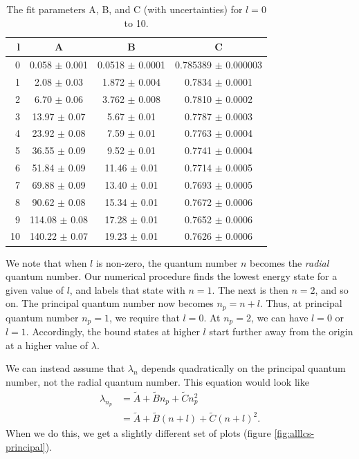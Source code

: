 \documentclass[12pt,twoside]{reedthesis}
\newcommand{\eq}[1]{\begin{align}#1\end{align}}
\begin{document}
\begin{table}[h]
	\centering
	\caption{The fit parameters A, B, and C (with uncertainties) for $l = 0$ to 10.}
	\label{tab:fitparams}
	\begin{tabular}{r|ccc}
		l	& A	 	& B	 	& C	 \\
		\hline
		0	& 0.058	$\pm$ 0.001	& 0.0518	$\pm$ 0.0001	& 0.785389	$\pm$ 0.000003\\
		1	& 2.08	$\pm$ 0.03	& 1.872	$\pm$ 0.004	& 0.7834	$\pm$ 0.0001\\
		2	& 6.70	$\pm$ 0.06	& 3.762	$\pm$ 0.008	& 0.7810	$\pm$ 0.0002\\
		3	& 13.97	$\pm$ 0.07	& 5.67	$\pm$ 0.01	& 0.7787	$\pm$ 0.0003\\
		4	& 23.92	$\pm$ 0.08	& 7.59	$\pm$ 0.01	& 0.7763	$\pm$ 0.0004\\
		5	& 36.55	$\pm$ 0.09	& 9.52	$\pm$ 0.01	& 0.7741	$\pm$ 0.0004\\
		6	& 51.84	$\pm$ 0.09	& 11.46	$\pm$ 0.01	& 0.7714	$\pm$ 0.0005\\
		7	& 69.88	$\pm$ 0.09	& 13.40	$\pm$ 0.01	& 0.7693	$\pm$ 0.0005\\
		8	& 90.62	$\pm$ 0.08	& 15.34	$\pm$ 0.01	& 0.7672	$\pm$ 0.0006\\
		9	& 114.08	$\pm$ 0.08	& 17.28	$\pm$ 0.01	& 0.7652	$\pm$ 0.0006\\
		10	& 140.22	$\pm$ 0.07	& 19.23	$\pm$ 0.01	& 0.7626	$\pm$ 0.0006
	\end{tabular}
\end{table}

We note that when $l$ is non-zero, the quantum number $n$ becomes the \emph{radial} quantum number. Our numerical procedure finds the lowest energy state for a given value of $l$, and labels that state with $n = 1$. The next is then $n = 2$, and so on. The principal quantum number now becomes $n_p = n + l$. Thus, at principal quantum number $n_p = 1$, we require that $l = 0$. At $n_p = 2$, we can have $l = 0$ or $l = 1$. Accordingly, the bound states at higher $l$ start further away from the origin at a higher value of $\lambda$. 

We can instead assume that $\lambda_n$ depends quadratically on the principal quantum number, not the radial quantum number. This equation would look like
\eq{
\lambda_{n_p} &= \tilde{A} + \tilde{B} n_p + \tilde{C} n_p^2 \\
&= \tilde{A} + \tilde{B} (n + l) + \tilde{C} (n + l)^2\mbox{.}
}
When we do this, we get a slightly different set of plots (figure \ref{fig:alllcs-principal}).
\end{document}
